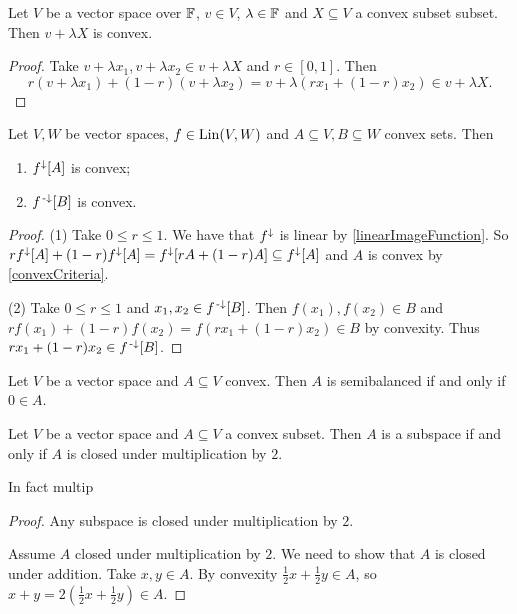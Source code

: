 \begin{lemma} \label{translationScalingConvexSet}
Let $V$ be a vector space over $\mathbb{F}$, $v\in V$, $\lambda\in \mathbb{F}$ and $X\subseteq V$ a convex subset subset. Then $v+\lambda X$ is convex.
\end{lemma}
\begin{proof}
Take $v+\lambda x_1, v+\lambda x_2 \in v+\lambda X$ and $r\in [0,1]$. Then
\[ r(v+\lambda x_1) + (1-r)(v+\lambda x_2) = v + \lambda(rx_1 + (1-r)x_2) \in v+\lambda X. \]
\end{proof}

\begin{lemma} \label{imagePreimageConvexSet}
Let $V,W$ be vector spaces, $f\in \operatorname{Lin}(V,W)$ and $A\subseteq V, B\subseteq W$ convex sets. Then
\begin{enumerate}
\item $f^\downarrow[A]$ is convex;
\item $f^{\text{\hspace{0.15em}-}\downarrow}[B]$ is convex.
\end{enumerate}
\end{lemma}
\begin{proof}
(1) Take $0\leq r \leq 1$. We have that $f^\downarrow$ is linear by \ref{linearImageFunction}. So $rf^\downarrow[A] + (1-r)f^\downarrow[A] = f^\downarrow[rA + (1-r)A] \subseteq f^\downarrow[A]$ and $A$ is convex by \ref{convexCriteria}.

(2) Take $0\leq r \leq 1$ and $x_1,x_2\in f^{\text{\hspace{0.15em}-}\downarrow}[B]$. Then $f(x_1),f(x_2)\in B$ and $rf(x_1) + (1-r)f(x_2) = f(rx_1 + (1-r)x_2)\in B$ by convexity. Thus $rx_1 + (1-r)x_2\in f^{\text{\hspace{0.15em}-}\downarrow}[B]$.
\end{proof}


\begin{lemma} \label{convexSemibalanced}
Let $V$ be a vector space and $A\subseteq V$ convex. Then $A$ is semibalanced \textup{if and only if} $0\in A$.
\end{lemma}

\begin{lemma} \label{convexSubspace}
Let $V$ be a vector space and $A \subseteq V$ a convex subset. Then $A$ is a subspace \textup{if and only if} $A$ is closed under multiplication by $2$.
\end{lemma}
In fact multip
\begin{proof}
Any subspace is closed under multiplication by $2$.

Assume $A$ closed under multiplication by $2$. We need to show that $A$ is closed under addition. Take $x,y\in A$. By convexity $\frac{1}{2}x + \frac{1}{2}y\in A$, so $x+ y = 2\left(\frac{1}{2}x + \frac{1}{2}y\right)\in A$.
\end{proof}

